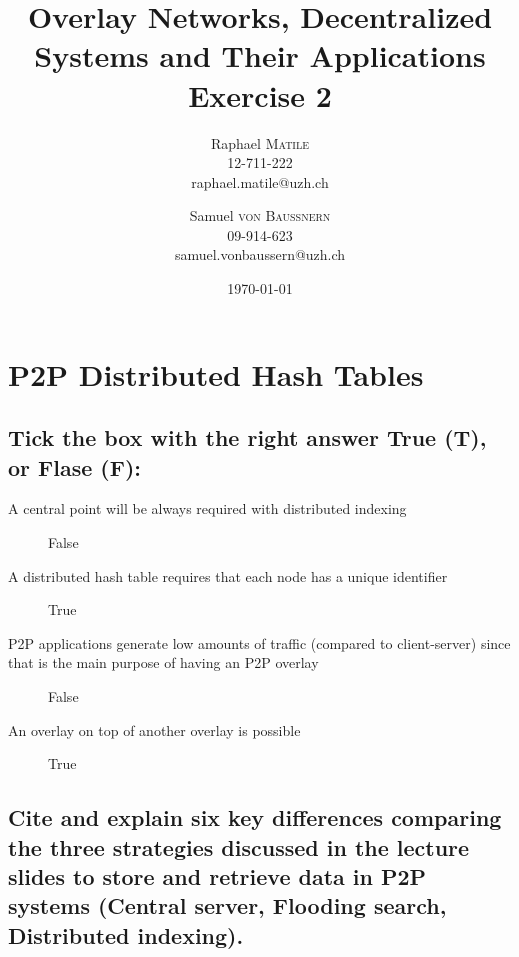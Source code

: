 \documentclass{article}
\title{Overlay Networks, Decentralized Systems and Their Applications
\\Exercise 2}
\author{Raphael \textsc{Matile}\\12-711-222\\raphael.matile@uzh.ch
\and Samuel \textsc{von Baussnern}\\09-914-623\\samuel.vonbaussern@uzh.ch}
\date{\today} %
\begin{document}
\maketitle %

\section{P2P Distributed Hash Tables}

\subsection{Tick the box with the right answer True (T), or Flase (F):}

\begin{description}
  \item[A central point will be always required with distributed indexing]
    False
  \item[A distributed hash table requires that each node has a unique identifier]
    True
  \item[P2P applications generate low amounts of traffic (compared to client-server)
        since that is the main purpose of having an P2P overlay]
    False
  \item[An overlay on top of another overlay is possible]
    True
\end{description}

\subsection{Cite and explain six key differences comparing the three strategies
discussed in the lecture slides to store and retrieve data in P2P systems
(Central server, Flooding search, Distributed indexing).}
\end{document}

